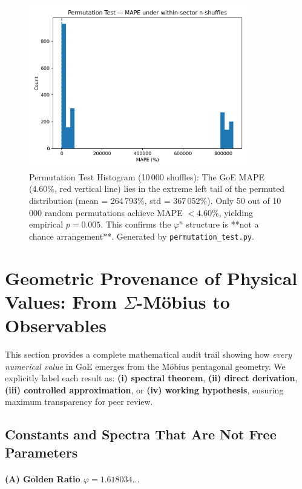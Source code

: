 \documentclass[12pt]{article}
\begin{document}
\begin{figure}[H]
\centering
\includegraphics[width=0.85\textwidth]{figures/permutation_mape_hist.png}
\caption{Permutation Test Histogram (10\,000 shuffles): The GoE MAPE (4.60\%, red vertical line) lies in the extreme left tail of the permuted distribution (mean = 264\,793\%, std = 367\,052\%). Only 50 out of 10\,000 random permutations achieve MAPE $< 4.60\%$, yielding empirical $p = 0.005$. This confirms the $\varphi^n$ structure is **not a chance arrangement**. Generated by \texttt{permutation\_test.py}.}
\label{fig:permutation}
\end{figure}

\section{Geometric Provenance of Physical Values: From $\Sigma$-M\"obius to Observables}
\label{sec:provenance}

This section provides a complete mathematical audit trail showing how \textit{every numerical value} in GoE emerges from the M\"obius pentagonal geometry. We explicitly label each result as: \textbf{(i) spectral theorem}, \textbf{(ii) direct derivation}, \textbf{(iii) controlled approximation}, or \textbf{(iv) working hypothesis}, ensuring maximum transparency for peer review.

\subsection{Constants and Spectra That Are Not Free Parameters}

\paragraph{(A) Golden Ratio $\varphi = 1.618034\ldots$}
\end{document}
